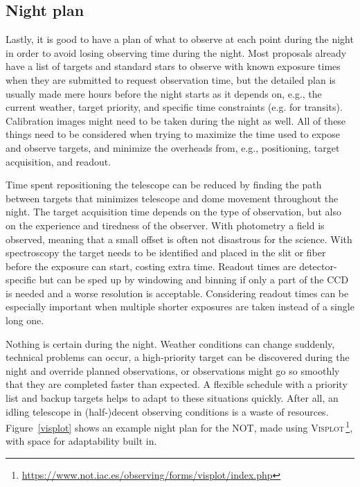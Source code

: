 \documentclass[a4paper,oneside,12pt, class=Latex/Classes/PhDthesisPSnPDF, crop=false]{standalone}
\begin{document}
\subsection{Night plan}
Lastly, it is good to have a plan of what to observe at each point during the night in order to avoid losing observing time during the night. Most proposals already have a list of targets and standard stars to observe with known exposure times when they are submitted to request observation time, but the detailed plan is usually made mere hours before the night starts as it depends on, e.g., the current weather, target priority, and specific time constraints (e.g. for transits). Calibration images might need to be taken during the night as well. All of these things need to be considered when trying to maximize the time used to expose and observe targets, and minimize the overheads from, e.g., positioning, target acquisition, and readout.

Time spent repositioning the telescope can be reduced by finding the path between targets that minimizes telescope and dome movement throughout the night. The target acquisition time depends on the type of observation, but also on the experience and tiredness of the observer. With photometry a field is observed, meaning that a small offset is often not disastrous for the science. With spectroscopy the target needs to be identified and placed in the slit or fiber before the exposure can start, costing extra time. Readout times are detector-specific but can be sped up by windowing and binning if only a part of the CCD is needed and a worse resolution is acceptable. Considering readout times can be especially important when multiple shorter exposures are taken instead of a single long one.

Nothing is certain during the night. Weather conditions can change suddenly, technical problems can occur, a high-priority target can be discovered during the night and override planned observations, or observations might go so smoothly that they are completed faster than expected. A flexible schedule with a priority list and backup targets helps to adapt to these situations quickly. After all, an idling telescope in (half-)decent observing conditions is a waste of resources. Figure~\ref{visplot} shows an example night plan for the NOT, made using \textsc{Visplot}\,\footnote{\url{https://www.not.iac.es/observing/forms/visplot/index.php}}, with space for adaptability built in.
\end{document}
